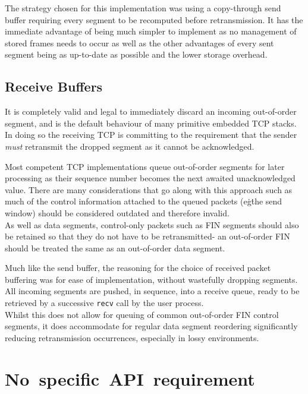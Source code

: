             The strategy chosen for this implementation was using a copy-through send buffer requiring every segment to be recomputed before retransmission. It has the immediate advantage of being much simpler to implement as no management of stored frames needs to occur as well as the other advantages of every sent segment being as up-to-date as possible and the lower storage overhead.

        \subsection{Receive Buffers}
            It is completely valid and legal to immediately discard an incoming out-of-order segment, and is the default behaviour of many primitive embedded TCP stacks. In doing so the receiving TCP is committing to the requirement that the sender \textit{must} retransmit the dropped segment as it cannot be acknowledged.

            Most competent TCP implementations queue out-of-order segments for later processing as their sequence number becomes the next awaited unacknowledged value. There are many considerations that go along with this approach such as much of the control information attached to the queued packets (e\.g\. the send window) should be considered outdated and therefore invalid. \\
            As well as data segments, control-only packets such as FIN segments should also be retained so that they do not have to be retransmitted- an out-of-order FIN should be treated the same as an out-of-order data segment.

            Much like the send buffer, the reasoning for the choice of received packet buffering was for ease of implementation, without wastefully dropping segments. All incoming segments are pushed, in sequence, into a receive queue, ready to be retrieved by a successive \texttt{recv} call by the user process. \\
            Whilst this does not allow for queuing of common out-of-order FIN control segments, it does accommodate for regular data segment reordering significantly reducing retransmission occurrences, especially in lossy environments.

    \section{\mbox{No specific API requirement}}

